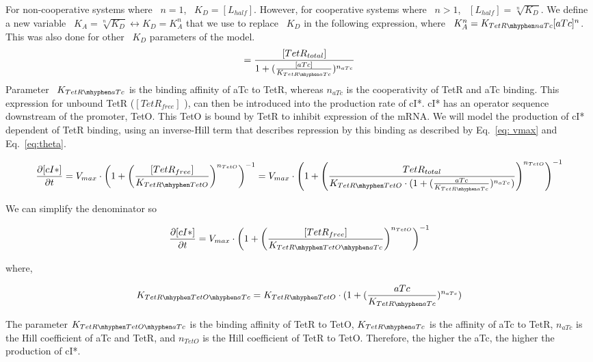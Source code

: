 For non-cooperative systems where ~$n=1$, ~$K_{D}=[L_{half}]$.
However, for cooperative systems where ~$n>1$, ~$[L_{half}] = \sqrt[n]{K_{D}}$.
We define a new variable ~$K_{A} = \sqrt[n]{K_{D}} \leftrightarrow K_{D} = K^n_{A}$ that we use to replace ~$K_{D}$ in the following expression, where ~$K^n_{A} = K_{TetR \mhyphen naTc}{[aTc]^n}$.
This was also done for other ~$K_{D}$ parameters of the model.
\begin{equation}
[TetR_{free}] =  \frac{[TetR_{total}]}{1+(\frac{[aTc]}{K_{TetR \mhyphen aTc}})^{n_{aTc}}}
\end{equation}
Parameter ~$K_{TetR \mhyphen aTc}$ is the binding affinity of aTc to TetR, whereas $n_{aTc}$ is the cooperativity of TetR and aTc binding.
This expression for unbound TetR ($[TetR_{free}]$ ), can then be introduced into the production rate of cI*.
cI* has an operator sequence downstream of the promoter, TetO.
This TetO is bound by TetR to inhibit expression of the mRNA. We will model the production of cI* dependent of TetR binding, using an inverse-Hill term that describes repression by this binding as described by Eq.~\ref{eq: vmax} and Eq.~\ref{eq:theta}.

\begin{equation}
    \pdv{[cI*]}{t} = V_{max}\cdot \left(1+\left(\frac{[TetR_{free}]}{K_{TetR \mhyphen TetO}}\right)^{n_{TetO}}\right)^{-1} = V_{max} \cdot \left(1+\left(\frac{TetR_{total}}{K_{TetR \mhyphen TetO}\cdot(1+(\frac{aTc}{K_{TetR \mhyphen aTc}})^{n_{aTc}})}\right)^{n_{TetO}}\right)^{-1}
\end{equation}

We can simplify the denominator so

\begin{equation}
    \pdv{[cI*]}{t} = V_{max}\cdot \left(1+\left(\frac{[TetR_{free}]}{K_{TetR \mhyphen TetO \mhyphen aTc }}\right)^{n_{TetO}}\right)^{-1}
\end{equation}

where,

\begin{equation}
    K_{TetR \mhyphen TetO \mhyphen aTc }=K_{TetR \mhyphen TetO}\cdot(1+(\frac{aTc}{K_{TetR \mhyphen aTc}})^{n_{aTc}})
\end{equation}


The parameter $K_{TetR \mhyphen TetO \mhyphen aTc }$ is the binding affinity of TetR to TetO, $K_{TetR \mhyphen aTc}$ is the affinity of aTc to TetR, $n_{aTc}$ is the Hill coefficient of aTc and TetR, and $n_{TetO}$ is the Hill coefficient of TetR to TetO.
Therefore, the higher the aTc, the higher the production of cI*.

